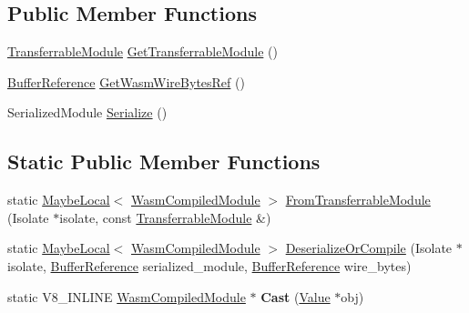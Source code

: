 \subsection*{Public Member Functions}
\begin{DoxyCompactItemize}
\item 
\mbox{\hyperlink{classv8_1_1WasmCompiledModule_1_1TransferrableModule}{Transferrable\+Module}} \mbox{\hyperlink{classv8_1_1WasmCompiledModule_a8960a296a1b431625a0bb0809843308b}{Get\+Transferrable\+Module}} ()
\item 
\mbox{\hyperlink{structv8_1_1WasmCompiledModule_1_1BufferReference}{Buffer\+Reference}} \mbox{\hyperlink{classv8_1_1WasmCompiledModule_ad23a7cac4e5b5ccd988dc5e29cc819b6}{Get\+Wasm\+Wire\+Bytes\+Ref}} ()
\item 
Serialized\+Module \mbox{\hyperlink{classv8_1_1WasmCompiledModule_a9750caa21b43b72f799d304857cbb6b0}{Serialize}} ()
\end{DoxyCompactItemize}
\subsection*{Static Public Member Functions}
\begin{DoxyCompactItemize}
\item 
static \mbox{\hyperlink{classv8_1_1MaybeLocal}{Maybe\+Local}}$<$ \mbox{\hyperlink{classv8_1_1WasmCompiledModule}{Wasm\+Compiled\+Module}} $>$ \mbox{\hyperlink{classv8_1_1WasmCompiledModule_a918c7382164ec45c03560538d3e52481}{From\+Transferrable\+Module}} (Isolate $\ast$isolate, const \mbox{\hyperlink{classv8_1_1WasmCompiledModule_1_1TransferrableModule}{Transferrable\+Module}} \&)
\item 
static \mbox{\hyperlink{classv8_1_1MaybeLocal}{Maybe\+Local}}$<$ \mbox{\hyperlink{classv8_1_1WasmCompiledModule}{Wasm\+Compiled\+Module}} $>$ \mbox{\hyperlink{classv8_1_1WasmCompiledModule_adafb5819c0867c619c5a9581b590d16a}{Deserialize\+Or\+Compile}} (Isolate $\ast$isolate, \mbox{\hyperlink{structv8_1_1WasmCompiledModule_1_1BufferReference}{Buffer\+Reference}} serialized\+\_\+module, \mbox{\hyperlink{structv8_1_1WasmCompiledModule_1_1BufferReference}{Buffer\+Reference}} wire\+\_\+bytes)
\item 
\mbox{\label{classv8_1_1WasmCompiledModule_a6dace1927ba208e592a4dc67ccc8149c}} 
static V8\+\_\+\+I\+N\+L\+I\+NE \mbox{\hyperlink{classv8_1_1WasmCompiledModule}{Wasm\+Compiled\+Module}} $\ast$ {\bfseries Cast} (\mbox{\hyperlink{classv8_1_1Value}{Value}} $\ast$obj)
\end{DoxyCompactItemize}


